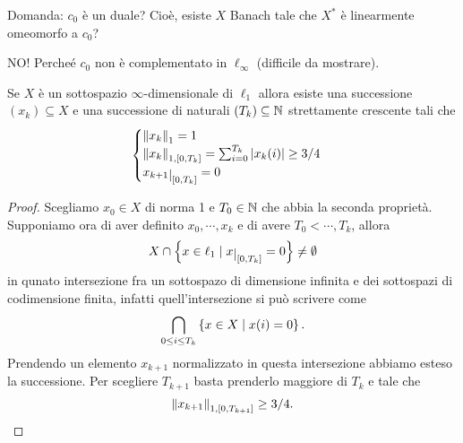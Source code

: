 \begin{remark}
Domanda: $c_0$ \`e un duale? Cio\`e, esiste $X$ Banach tale che $X^\ast$ \`e linearmente omeomorfo a $c_0$?

NO! Perche\'e $c_0$ non \`e complementato in $\ell_\infty$ (difficile da mostrare).
\end{remark}

\begin{lemma}\label{LmSuccessioneInl1}
Se $X$ \`e un sottospazio $\infty$-dimensionale di $\ell_1$ allora esiste una successione $(x_k)\subseteq X$ e una successione di naturali $(T_k)\subseteq \mathbb{N}$ strettamente crescente tali che 
\[\begin{cases}
\norm {x_k}_1=1\\
\norm{x_k}_{1,[0,T_k]}=\sum_{i=0}^{T_k}\abs{x_k(i)}\geq 3/4\\
x_{k+1}\res{[0,T_k]}=0
\end{cases}\]
\end{lemma}
\begin{proof}
Scegliamo $x_0\in X$ di norma 1 e $T_0\in \mathbb{N}$ che abbia la seconda propriet\`a. Supponiamo ora di aver definito $x_0,\cdots, x_k$ e di avere $T_0<\cdots, T_k$, allora
\[X\cap \cpa{x\in\ell_1\mid x\res{[0,T_k]}=0}\neq \emptyset\]
in qunato intersezione fra un sottospazo di dimensione infinita e dei sottospazi di codimensione finita, infatti quell'intersezione si pu\`o scrivere come
\[\bigcap_{0\leq i\leq T_k}\left\{{x\in X\mid x(i)=0}\right\}.\]
Prendendo un elemento $x_{k+1}$ normalizzato in questa intersezione abbiamo esteso la successione. Per scegliere $T_{k+1}$ basta prenderlo maggiore di $T_k$ e tale che 
\[\left\Vert{x_{k+1}}\right\Vert_{1,[0,T_{k+1}]}\geq 3/4.\]
\end{proof}

